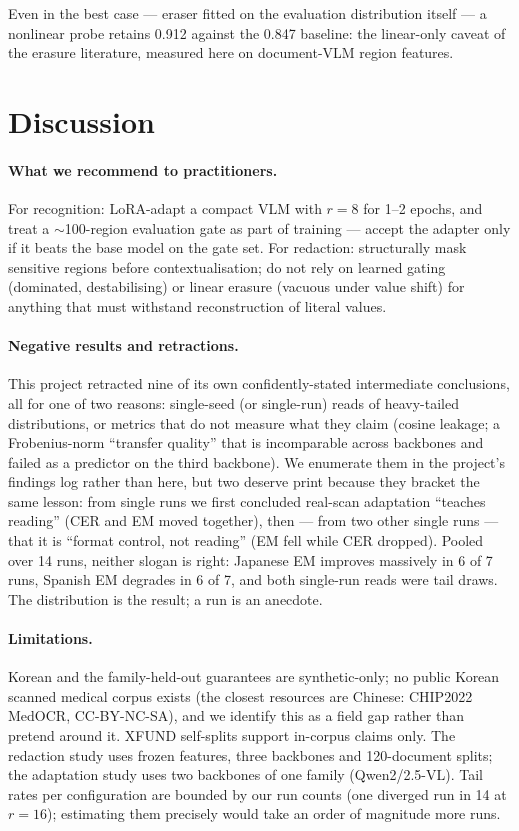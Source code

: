 \documentclass[11pt]{article}
\begin{document}
Even in the best case --- eraser fitted on the evaluation distribution
itself --- a nonlinear probe retains 0.912 against the 0.847 baseline: the
linear-only caveat of the erasure literature, measured here on document-VLM
region features.

\section{Discussion}\label{sec:discussion}

\paragraph{What we recommend to practitioners.} For recognition: LoRA-adapt
a compact VLM with $r{=}8$ for 1--2 epochs, and treat a $\sim$100-region
evaluation gate as part of training --- accept the adapter only if it beats
the base model on the gate set. For redaction: structurally mask sensitive
regions before contextualisation; do not rely on learned gating (dominated,
destabilising) or linear erasure (vacuous under value shift) for anything
that must withstand reconstruction of literal values.

\paragraph{Negative results and retractions.} This project retracted nine of
its own confidently-stated intermediate conclusions, all for one of two
reasons: single-seed (or single-run) reads of heavy-tailed distributions, or
metrics that do not measure what they claim (cosine leakage; a
Frobenius-norm ``transfer quality'' that is incomparable across backbones
and failed as a predictor on the third backbone). We enumerate them in the
project's findings log rather than here, but two deserve print because they
bracket the same lesson: from single runs we first concluded real-scan
adaptation ``teaches reading'' (CER and EM moved together), then ---
from two other single runs --- that it is ``format control, not reading''
(EM fell while CER dropped). Pooled over 14 runs, neither slogan is right:
Japanese EM improves massively in 6 of 7 runs, Spanish EM degrades in 6 of
7, and both single-run reads were tail draws. The distribution is the
result; a run is an anecdote.

\paragraph{Limitations.} Korean and the family-held-out guarantees are
synthetic-only; no public Korean scanned medical corpus exists (the closest
resources are Chinese: CHIP2022 MedOCR, CC-BY-NC-SA), and we identify this
as a field gap rather than pretend around it. XFUND self-splits support
in-corpus claims only. The redaction study uses frozen features, three
backbones and 120-document splits; the adaptation study uses two backbones
of one family (Qwen2/2.5-VL). Tail rates per configuration are bounded by
our run counts (one diverged run in 14 at $r{=}16$); estimating them
precisely would take an order of magnitude more runs.
\end{document}
